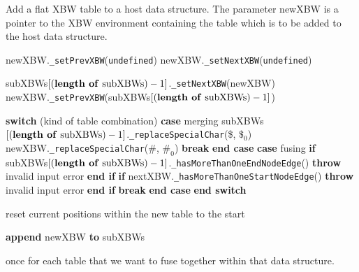 \documentclass[a4paper,12pt,twoside,BCOR=10mm]{scrbook}
\newcommand{\StateInd}{\State\hspace{0.6cm}}
\newcommand{\StateIndd}{\State\hspace{1.2cm}}
\newcommand{\StateInddd}{\State\hspace{1.8cm}}
\begin{document}
\begin{algorithm}
\caption[Add a table to a host data structure]{Add a flat XBW table to a host data structure. The parameter newXBW is a pointer to the XBW environment containing the table which is to be added to the host data structure.}
\label{alg:addSubXBW}
\begin{algorithmic}[1]

\State newXBW.\texttt{\_setPrevXBW}(\texttt{undefined})
\State newXBW.\texttt{\_setNextXBW}(\texttt{undefined})

\State \phantom{nl}

	\State subXBWs$[ (\textrm{\textbf{length of} subXBWs}) - 1 ]$.\texttt{\_setNextXBW}(newXBW)
	\State newXBW.\texttt{\_setPrevXBW}(subXBWs$[ (\textrm{\textbf{length of} subXBWs}) - 1 ]$)

	\State \phantom{nl}

	\State \textbf{switch} (kind of table combination)
		\StateInd \textbf{case} merging
			\StateIndd subXBWs$[ (\textrm{\textbf{length of} subXBWs}) - 1 ]$.\texttt{\_replaceSpecialChar}(\texttt{\textquotesingle}\$\texttt{\textquotesingle}, \texttt{\textquotesingle}$\$_0$\texttt{\textquotesingle})
			\StateIndd newXBW.\texttt{\_replaceSpecialChar}(\texttt{\textquotesingle}$\#$\texttt{\textquotesingle}, \texttt{\textquotesingle}$\#_0$\texttt{\textquotesingle})
			\StateIndd \textbf{break}
		\StateInd \textbf{end case}
		\StateInd \textbf{case} fusing
			\StateIndd \textbf{if} subXBWs$[ (\textrm{\textbf{length of} subXBWs}) - 1 ]$.\texttt{\_hasMoreThanOneEndNodeEdge}()
				\StateInddd \textbf{throw} invalid input error
			\StateIndd \textbf{end if}
			\StateIndd \textbf{if} nextXBW.\texttt{\_hasMoreThanOneStartNodeEdge}()
				\StateInddd \textbf{throw} invalid input error
			\StateIndd \textbf{end if}
			\StateIndd \textbf{break}
		\StateInd \textbf{end case}
	\State \textbf{end switch}
\EndIf

\State \phantom{nl}

\State reset current positions within the new table to the start

\State \phantom{nl}

\State \textbf{append} newXBW \textbf{to} subXBWs

\end{algorithmic}
\end{algorithm}
once for each table that we want to fuse together within that data structure.
\end{document}
